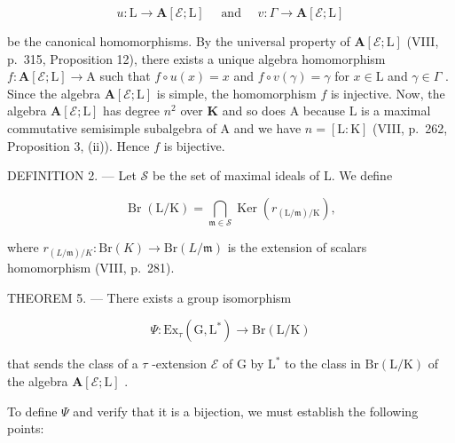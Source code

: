 \[
u: \mathrm{L} \to \mathbf {A} [ \mathcal {E}; \mathrm{L} ] \quad \text { and } \quad v: \Gamma \to \mathbf {A} [ \mathcal {E}; \mathrm{L} ]
\]

be the canonical homomorphisms. By the universal property of \(\mathbf{A}[\mathcal{E};\mathrm{L}]\) (VIII, p.~315, Proposition 12), there exists a unique algebra homomorphism \(f:\mathbf{A}[\mathcal{E};\mathrm{L}]\to \mathrm{A}\) such that \(f\circ u(x) = x\) and \(f\circ v(\gamma) = \gamma\) for \(x\in \mathrm{L}\) and \(\gamma \in \Gamma\) . Since the algebra \(\mathbf{A}[\mathcal{E};\mathrm{L}]\) is simple, the homomorphism \(f\) is injective. Now, the algebra \(\mathbf{A}[\mathcal{E};\mathrm{L}]\) has degree \(n^2\) over \(\mathbf{K}\) and so does \(\mathrm{A}\) because \(\mathrm{L}\) is a maximal commutative semisimple subalgebra of \(\mathrm{A}\) and we have \(n = [\mathrm{L}:\mathrm{K}]\) (VIII, p.~262, Proposition 3, (ii)). Hence \(f\) is bijective.

DEFINITION 2. --- Let \(\mathscr{S}\) be the set of maximal ideals of L. We define

\[
\operatorname{Br} (\mathrm{L} / \mathrm{K}) = \bigcap_ {\mathfrak {m} \in \mathscr {S}} \operatorname{Ker} (r _ {(\mathrm{L} / \mathfrak {m}) / \mathrm{K}}),
\]

where \(r_{(L/\mathfrak{m})/K} : \mathrm{Br}(K) \to \mathrm{Br}(L/\mathfrak{m})\) is the extension of scalars homomorphism (VIII, p.~281).

THEOREM 5. --- There exists a group isomorphism

\[
\Psi : \mathrm{Ex} _ {\tau} (\mathrm{G}, \mathrm{L} ^ {*}) \longrightarrow \mathrm{Br} (\mathrm{L} / \mathrm{K})
\]

that sends the class of a \(\tau\) -extension \(\mathcal{E}\) of G by \(\mathrm{L}^*\) to the class in \(\mathrm{Br}(\mathrm{L} / \mathrm{K})\) of the algebra \(\mathbf{A}[\mathcal{E};\mathrm{L}]\) .

To define \(\Psi\) and verify that it is a bijection, we must establish the following points:

